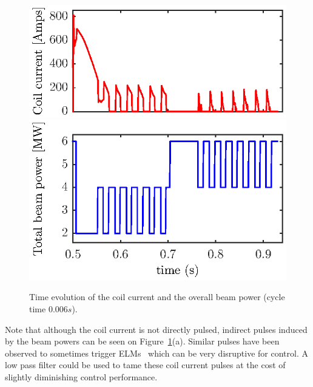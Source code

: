 \documentclass[12pt,lot, lof]{puthesis}
\begin{document}
\begin{figure}[htbp]
	\centering
	\includegraphics[width=0.7 \linewidth]{fig19a}  \\[-0.5em]
	\includegraphics[width=0.7 \linewidth]{fig19b} 
	\caption{Time evolution of the coil current and the overall beam power (cycle time $0.006 s$). }
	\label{res2}
\end{figure}

Note that although the coil current is not directly pulsed, indirect pulses induced by the beam powers can be seen on Figure~\ref{res2}(a).
Similar pulses have been observed to sometimes trigger ELMs~\cite{Canik10} which can be very disruptive for control.
A low pass filter could be used to tame these coil current pulses at the cost of slightly diminishing control performance.
\end{document}
